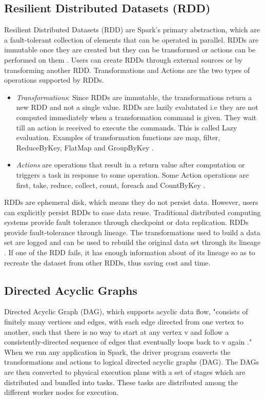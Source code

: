 \documentclass[9pt,twocolumn,twoside]{../../styles/osajnl}
\begin{document}
\subsection{Resilient Distributed Datasets (RDD)}
Resilient Distributed Datasets (RDD) \cite{paper-RDD} are Spark's
primary abstraction, which are a fault-tolerant collection of elements
that can be operated in parallel. RDDs are immutable once they are
created but they can be transformed or actions can be performed on
them \cite{article-spark-1}. Users can create RDDs through external
sources or by transforming another RDD. Transformations and Actions
are the two types of operations supported by RDDs.
\begin{itemize}
\item \textit{Transformations}: Since RDDs are immutable, the
  transformations return a new RDD and not a single value. RDDs are
  lazily evalutated i.e they are not computed immediately when a
  transformation command is given. They wait till an action is
  received to execute the commands. This is called Lazy
  evaluation. Examples of transformation functions are map, filter,
  ReduceByKey, FlatMap and GroupByKey \cite{article-spark-1}.
\item \textit{Actions} are operations that result in a return value
  after computation or triggers a task in response to some
  operation. Some Action operations are first, take, reduce, collect,
  count, foreach and CountByKey \cite{article-spark-1}.
\end{itemize}
RDDs are ephemeral disk, which means they do not persist
data. However, users can explicitly persist RDDs to ease data
reuse. Traditional distributed computing systems provide fault
tolerance through checkpoint or data replication. RDDs provide
fault-tolerance through lineage. The transformations used to build a
data set are logged and can be used to rebuild the original data set
through its lineage \cite{paper-RDD}. If one of the RDD fails, it has
enough information about of its lineage so as to recreate the dataset
from other RDDs, thus saving cost and time.
\subsection{Directed Acyclic Graphs}
Directed Acyclic Graph (DAG), which supports acyclic data flow,
"consists of finitely many vertices and edges, with each edge directed
from one vertex to another, such that there is no way to start at any
vertex v and follow a consistently-directed sequence of edges that
eventually loops back to v again \cite{wiki-DAG}." When we run any
application in Spark, the driver program converts the transformations
and actions to logical directed acyclic graphs (DAG). The DAGs are then
converted to physical execution plans with a set of stages which are
distributed and bundled into tasks. These tasks are distributed among
the different worker nodes for execution.
\end{document}
